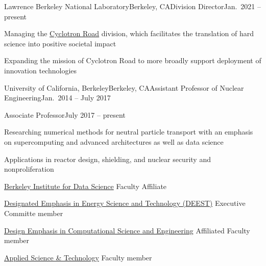 \begin{rSubsection}{Lawrence Berkeley National Laboratory}{Berkeley,
CA}{Division Director}{Jan.\ 2021 -- present}
\item Managing the \href{https://www.cyclotronroad.org/}{Cyclotron Road} division,
which facilitates the translation of hard science into positive societal impact
\item Expanding the mission of Cyclotron Road to more broadly support deployment of
innovation technologies 
\end{rSubsection}


\begin{rSubsection}{University of California, Berkeley}{Berkeley, CA}{Assistant
Professor of Nuclear Engineering}{Jan.\ 2014 -- July 2017}
\end{rSubsection}
\vspace*{-2 em}
\begin{rSubsection}{}{}{Associate Professor}{July 2017 -- present}
\item Researching numerical methods for neutral particle transport with an emphasis on supercomputing and advanced architectures as well as data science
\item Applications in reactor design, shielding, and nuclear security and nonproliferation
\item \href{http://bids.berkeley.edu/}{Berkeley Institute for Data Science}
Faculty Affiliate
\item \href{https://me.berkeley.edu/graduate/special-programs/deest/}{Designated
Emphasis in Energy Science and Technology (DEEST)} Executive Committe member
\item \href{http://citris-uc.org/decse-mission/}{Design Emphasis in Computational Science and Engineering} Affiliated Faculty member
\item \href{http://ast.coe.berkeley.edu/}{Applied Science \& Technology} Faculty member
\end{rSubsection}


